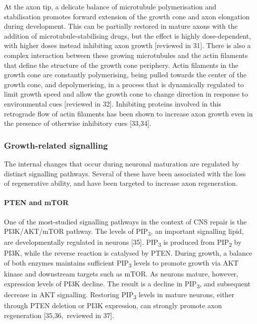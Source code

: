 \documentclass[
  12pt,
  a4paper,
]{book}
\begin{document}
At the axon tip, a delicate balance of microtubule polymerisation and stabilisation promotes forward extension of the growth cone and axon elongation during development. This can be partially restored in mature axons with the addition of microtubule-stabilising drugs, but the effect is highly dose-dependent, with higher doses instead inhibiting axon growth {[}reviewed in 31{]}. There is also a complex interaction between these growing microtubules and the actin filaments that define the structure of the growth cone periphery. Actin filaments in the growth cone are constantly polymerising, being pulled towards the center of the growth cone, and depolymerising, in a process that is dynamically regulated to limit growth speed and allow the growth cone to change direction in response to environmental cues {[}reviewed in 32{]}. Inhibiting proteins involved in this retrograde flow of actin filaments has been shown to increase axon growth even in the presence of otherwise inhibitory cues {[}33,34{]}.

\hypertarget{growth-related-signalling}{%
\subsubsection{Growth-related signalling}\label{growth-related-signalling}}

The internal changes that occur during neuronal maturation are regulated by distinct signalling pathways. Several of these have been associated with the loss of regenerative ability, and have been targeted to increase axon regeneration.

\hypertarget{pten-and-mtor}{%
\paragraph{PTEN and mTOR}\label{pten-and-mtor}}

One of the most-studied signalling pathways in the context of CNS repair is the PI3K/AKT/mTOR pathway. The levels of PIP\textsubscript{3}, an important signalling lipid, are developmentally regulated in neurons {[}35{]}. PIP\textsubscript{3} is produced from PIP\textsubscript{2} by PI3K, while the reverse reaction is catalysed by PTEN. During growth, a balance of both enzymes maintains sufficient PIP\textsubscript{3} levels to promote growth via AKT kinase and downstream targets such as mTOR. As neurons mature, however, expression levels of PI3K decline. The result is a decline in PIP\textsubscript{3}, and subsequent decrease in AKT signalling. Restoring PIP\textsubscript{3} levels in mature neurons, either through PTEN deletion or PI3K expression, can strongly promote axon regeneration {[}35,36,~reviewed in 37{]}.
\end{document}
